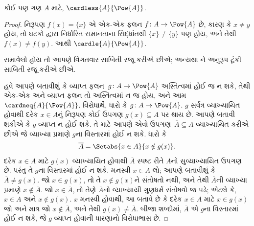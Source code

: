 \begin{thm}[કૅન્ટૉર]
કોઈ પણ ગણ $A$ માટે, $\cardless{A}{\Pow{A}}$.
\end{thm}

\begin{proof}
નિરૂપણ $f(x) = \{x\}$ એ એક-એક ફલન $f \colon A \to \Pow{A}$
છે, કારણ કે $x \neq y$ હોય, તો ઘટકો દ્વારા નિર્ધારિત સમાનતાના
સિદ્ધાંતથી $\{x\} \neq \{y\}$ પણ હોય, અને તેથી $f(x) \neq f(y)$.
આથી $\cardle{A}{\Pow{A}}$.

\begin{editorial}
 સમાવેલો હોય તો આપણે વિગતવાર સાબિતી રજૂ કરીએ છીએ;
અન્યથા ને અનુરૂપ ટૂંકી સાબિતી રજૂ કરીએ છીએ.
\end{editorial}

%
  હવે આપણે બતાવીશું કે વ્યાપ્ત ફલન~$g\colon A \to
  \Pow{A}$ અસ્તિત્વમાં હોઈ જ ન શકે, તેથી એક-એક અને વ્યાપ્ત ફલન તો
  અસ્તિત્વમાં ન જ હોય, અને આમ $\cardneq{A}{\Pow{A}}$. વિરોધાર્થે,
  ધારો કે $g\colon A \to \Pow{A}$. $g$ સર્વત્ર વ્યાખ્યાયિત હોવાથી દરેક
  $x \in A$નું નિરૂપણ કોઈ ઉપગણ $g(x) \subseteq A$ પર થાય છે.
  આપણે બતાવી શકીએ કે $g$ વ્યાપ્ત ન હોઈ શકે. તે માટે આપણે એવો
  ઉપગણ~$\overline{A} \subseteq A$ વ્યાખ્યાયિત કરીએ છીએ જે
  વ્યાખ્યા પ્રમાણે $g$ના વિસ્તારમાં હોઈ ન શકે. ધારો કે
  \[
  \overline{A} = \Setabs{x \in A}{x \notin g(x)}.
  \]
  દરેક $x \in A$ માટે $g(x)$ વ્યાખ્યાયિત હોવાથી $\overline{A}$
  સ્પષ્ટ રીતે $A$નો સુવ્યાખ્યાયિત ઉપગણ છે. પરંતુ તે $g$ના વિસ્તારમાં
  હોઈ ન શકે. મનસ્વી $x \in A$ લો; આપણે બતાવીશું કે
  $\overline{A} \neq g(x)$. જો $x \in g(x)$, તો તે
  $x \notin g(x)$ને સંતોષતો નથી, અને તેથી $\overline{A}$ની વ્યાખ્યા
  પ્રમાણે $x \notin \overline{A}$. જો $x \in \overline{A}$, તો
  તેણે $\overline{A}$નો વ્યાખ્યાયી ગુણધર્મ સંતોષવો જ પડે; એટલે કે,
  $x \in A$ અને $x \notin g(x)$. $x$ મનસ્વી હોવાથી, આ બતાવે છે કે
  દરેક $x \in A$ માટે $x \in g(x)$ જો અને માત્ર જો
  $x \notin \overline{A}$, અને તેથી $g(x) \neq \overline{A}$.
  બીજા શબ્દોમાં, $\overline{A}$ એ $g$ના વિસ્તારમાં હોઈ ન શકે, જે
  $g$ વ્યાપ્ત હોવાની ધારણાનો વિરોધાભાસ છે.
\end{proof}

